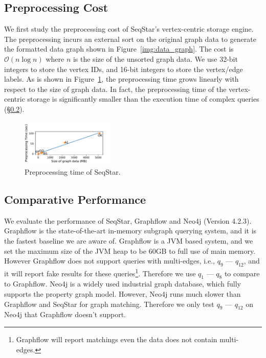 \subsection{Preprocessing Cost}
We first study the preprocessing cost of SeqStar's vertex-centric storage engine.
The preprocessing incurs an external sort on the original graph data to generate the formatted data graph shown in Figure~\ref{img:data_graph}.
The cost is $\mathcal{O}(n \log n)$ where $n$ is the size of the unsorted graph data.
We use 32-bit integers to store the vertex IDs, and 16-bit integers to store the vertex/edge labels.
As is shown in Figure~\ref{img:exp_preprocessing}, the preprocessing time grows linearly with respect to the size of graph data.
In fact, the preprocessing time of the vertex-centric storage is significantly smaller than the execution time of complex queries (\S\ref{sec:experiments_compare}).

\begin{figure}[ht]
  \centering
  \includegraphics[width=0.4\textwidth]{img/exp_preprocessing.pdf}
  \caption{Preprocessing time of SeqStar.}\label{img:exp_preprocessing}
\end{figure}
\subsection{Comparative Performance}\label{sec:experiments_compare}
We evaluate the performance of SeqStar, Graphflow and Neo4j (Version 4.2.3).
Graphflow is the state-of-the-art in-memory subgraph querying system,
and it is the fastest baseline we are aware of.
Graphflow is a JVM based system, and we set the maximum size of the JVM heap to be 60GB to full use of main memory.
However Graphflow does not support queries with multi-edges, i.e., $q_9$ --- $q_{12}$,
and it will report fake results for these queries\footnote{Graphflow will report matchings even the data does not contain multi-edges.}.
Therefore we use $q_1$ --- $q_8$ to compare to Graphflow.
Neo4j is a widely used industrial graph database, which fully supports the property graph model.
However, Neo4j runs much slower than Graphflow and SeqStar for graph matching.
Therefore we only test $q_9$ --- $q_{12}$  on Neo4j that Graphflow doesn't support.

